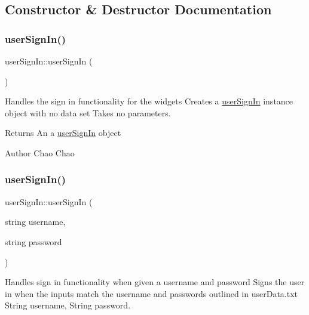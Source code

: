 \subsection{Constructor \& Destructor Documentation}
\mbox{\label{classuser_sign_in_aadda1c072fd82f92a63aeec71410669f}} 
\subsubsection{\texorpdfstring{user\+Sign\+In()}{userSignIn()}\hspace{0.1cm}{\footnotesize\ttfamily [1/3]}}
{\footnotesize\ttfamily user\+Sign\+In\+::user\+Sign\+In (\begin{DoxyParamCaption}{ }\end{DoxyParamCaption})}



Handles the sign in functionality for the widgets  Creates a \mbox{\hyperlink{classuser_sign_in}{user\+Sign\+In}} instance object with no data set  Takes no parameters. 

\begin{DoxyReturn}{Returns}
An a \mbox{\hyperlink{classuser_sign_in}{user\+Sign\+In}} object 
\end{DoxyReturn}
\begin{DoxyAuthor}{Author}
Chao Chao 
\end{DoxyAuthor}
\mbox{\label{classuser_sign_in_a206594360b0e235dad6b7d9bdb315216}} 
\subsubsection{\texorpdfstring{user\+Sign\+In()}{userSignIn()}\hspace{0.1cm}{\footnotesize\ttfamily [2/3]}}
{\footnotesize\ttfamily user\+Sign\+In\+::user\+Sign\+In (\begin{DoxyParamCaption}\item[{string}]{username,  }\item[{string}]{password }\end{DoxyParamCaption})}



Handles sign in functionality when given a username and password  Signs the user in when the inputs match the username and passwords outlined in user\+Data.\+txt  String username, String password. 

